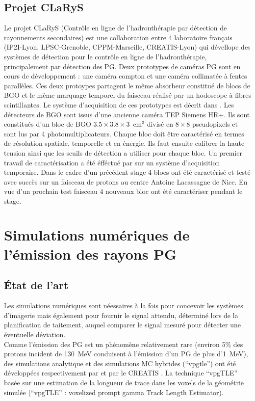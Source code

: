 \documentclass[11pt,a4paper,oldfontcommands]{memoir}
\begin{document}
\subsection{Projet CLaRyS}

Le projet CLaRyS (Contrôle en ligne de l’hadronthérapie par détection de rayonnements secondaires) est une collaboration entre 4 laboratoire français (IP2I-Lyon, LPSC-Grenoble, CPPM-Marseille, CREATIS-Lyon) qui dévellope des systèmes de détection pour le contrôle en ligne de l'hadronthérapie, principalement par détection des PG. Deux prototypes de caméras PG sont en cours de développement : une caméra compton et une caméra collimatée à fentes parallèles. Ces deux protoypes partagent le même absorbeur constitué de blocs de BGO et le même marquage temporel du faisceau réalisé par un hodoscope à fibres scintillantes. Le système d'acquisition de ces prototypes est décrit dans \cite{Caplan_2019}. Les détecteurs de BGO sont issus d'une ancienne caméra TEP Siemens HR+. Ils sont constitués d'un bloc de BGO $3.5 \times 3.8 \times 3$~cm$^3$ divisé en $8 \times 8$ pseudopixels et sont lus par 4 photomultiplicateurs. Chaque bloc doit être caractérisé en termes de résolution spatiale, temporelle et en énergie. Ils faut ensuite calibrer la haute tension ainsi que les seuils de détection a utiliser pour chaque bloc. Un premier travail de caractérisation a été éfféctué par \cite{Fontana_2018} sur un système d'acquisition temporaire. Dans le cadre d'un précédent stage  4 blocs ont été caractérisé et testé avec succès sur un faisceau de protons au centre Antoine Lacassagne de Nice. En vue d'un prochain test faisceau 4 nouveaux bloc ont été caractériser pendant le stage. 

\section{Simulations numériques de l'émission des rayons PG}

\subsection{\'Etat de l'art}

Les simulations numériques sont néessaires à la fois pour concevoir les systèmes d'imagerie mais également pour fournir le signal attendu, déterminé lors de la planification de taitement, auquel comparer le signal mesuré pour détecter une éventuelle déviation. \\
Comme l'émission des PG est un phénomène relativement rare (environ 5\% des protons incident de 130~MeV conduisent à l'émission d'un PG de plus d'1~MeV), des simulations analytique et des simulations MC hybrides (\enquote{vpgtle}) ont été développées respectivement par \cite{Sterpin_2015} et par le CREATIS \cite{Huisman_2016}. La technique \enquote{vpgTLE} basée sur une estimation de la longueur de trace dans les voxels de la géométrie simulée (\enquote{vpgTLE} : voxelized prompt gamma Track Length Estimator).
\end{document}
